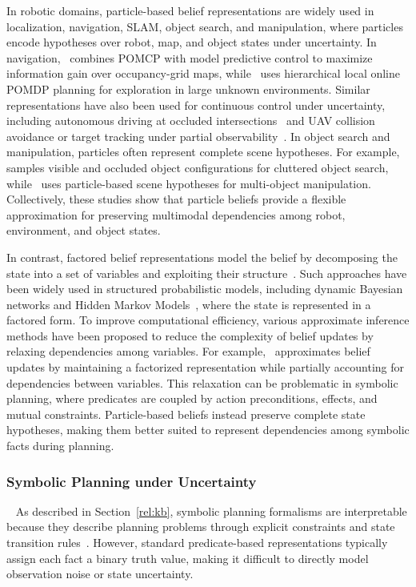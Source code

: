 In robotic domains, particle-based belief representations are widely used in localization, navigation, SLAM, object search, and manipulation, where particles encode hypotheses over robot, map, and object states under uncertainty. In navigation,~\cite{lauri2016exploration} combines POMCP with model predictive control to maximize information gain over occupancy-grid maps, while~\cite{kim2021plgrim} uses hierarchical local online POMDP planning for exploration in large unknown environments. Similar representations have also been used for continuous control under uncertainty, including autonomous driving at occluded intersections~\cite{brechtel2014continuous} and UAV collision avoidance or target tracking under partial observability~\cite{bai2011uav,vanegas2016uav}. In object search and manipulation, particles often represent complete scene hypotheses. For example,~\cite{xiao2019objectsearch} samples visible and occluded object configurations for cluttered object search, while~\cite{pajarinen2017multiobject,pajarinen2022composition} uses particle-based scene hypotheses for multi-object manipulation. Collectively, these studies show that particle beliefs provide a flexible approximation for preserving multimodal dependencies among robot, environment, and object states.


In contrast, factored belief representations model the belief by decomposing the state into a set of variables and exploiting their structure~\cite{hansen2000dynamic, feng2001approximate, veiga2014point}. Such approaches have been widely used in structured probabilistic models, including dynamic Bayesian networks and Hidden Markov Models~\cite{eddy1996hidden}, where the state is represented in a factored form. To improve computational efficiency, various approximate inference methods have been proposed to reduce the complexity of belief updates by relaxing dependencies among variables. For example,~\cite{murphy2013factored} approximates belief updates by maintaining a factorized representation while partially accounting for dependencies between variables. This relaxation can be problematic in symbolic planning, where predicates are coupled by action preconditions, effects, and mutual constraints. Particle-based beliefs instead preserve complete state hypotheses, making them better suited to represent dependencies among symbolic facts during planning.


\subsubsection{Symbolic Planning under Uncertainty}~\label{rel:pu_sym}
As described in Section~\ref{rel:kb}, symbolic planning formalisms are interpretable because they describe planning problems through explicit constraints and state transition rules~\cite{ghallab2016automated,lifschitz2019answer}. However, standard predicate-based representations typically assign each fact a binary truth value, making it difficult to directly model observation noise or state uncertainty.

